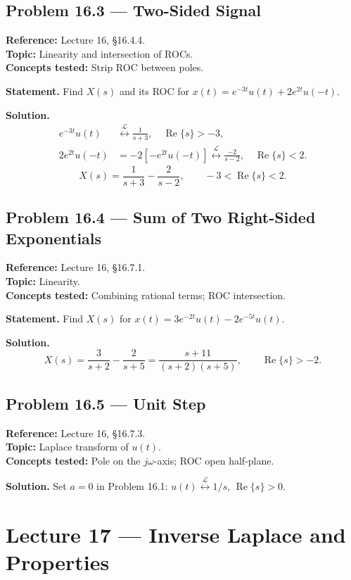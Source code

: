 \documentclass[11pt]{article}
\newcommand{\Lap}{\overset{\mathcal{L}}{\longleftrightarrow}}
\begin{document}
\subsection{Problem 16.3 --- Two-Sided Signal}
\textbf{Reference:} Lecture 16, \S 16.4.4.\\
\textbf{Topic:} Linearity and intersection of ROCs.\\
\textbf{Concepts tested:} Strip ROC between poles.

\textbf{Statement.} Find $X(s)$ and its ROC for $x(t) = e^{-3t}u(t) + 2e^{2t}u(-t)$.

\textbf{Solution.}
\begin{align*}
e^{-3t}u(t) &\Lap \frac{1}{s+3},\quad \operatorname{Re}\{s\}>-3,\\
2e^{2t}u(-t) &= -2[-e^{2t}u(-t)] \Lap \frac{-2}{s-2},\quad \operatorname{Re}\{s\}<2.
\end{align*}
\[
X(s) = \frac{1}{s+3}-\frac{2}{s-2},\qquad -3<\operatorname{Re}\{s\}<2.
\]

\subsection{Problem 16.4 --- Sum of Two Right-Sided Exponentials}
\textbf{Reference:} Lecture 16, \S 16.7.1.\\
\textbf{Topic:} Linearity.\\
\textbf{Concepts tested:} Combining rational terms; ROC intersection.

\textbf{Statement.} Find $X(s)$ for $x(t) = 3e^{-2t}u(t) - 2e^{-5t}u(t)$.

\textbf{Solution.}
\[
X(s) = \frac{3}{s+2}-\frac{2}{s+5} = \frac{s+11}{(s+2)(s+5)},\qquad \operatorname{Re}\{s\}>-2.
\]

\subsection{Problem 16.5 --- Unit Step}
\textbf{Reference:} Lecture 16, \S 16.7.3.\\
\textbf{Topic:} Laplace transform of $u(t)$.\\
\textbf{Concepts tested:} Pole on the $j\omega$-axis; ROC open half-plane.

\textbf{Solution.} Set $a=0$ in Problem 16.1: $u(t)\Lap 1/s$, $\operatorname{Re}\{s\}>0$.

\section{Lecture 17 --- Inverse Laplace and Properties}
\end{document}
